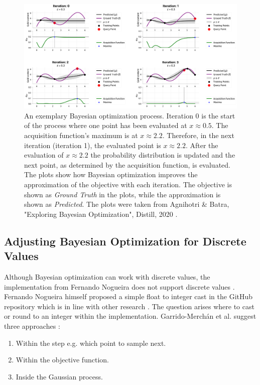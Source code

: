 \begin{figure}[!htb]
    \centering
    \includegraphics[width=\textwidth]{assets/bayesian_optimization_illustration.png}
    \caption{An exemplary Bayesian optimization process. Iteration 0 is the start of the process where one point has been evaluated at $x\approx0.5$. The acquisition function's maximum is at $x\approx2.2$. Therefore, in the next iteration (iteration 1), the evaluated point is $x\approx2.2$. After the evaluation of $x\approx2.2$ the probability distribution is updated and the next point, as determined by the acquisition function, is evaluated. The plots show how Bayesian optimization improves the approximation of the objective with each iteration. The objective is shown as \textit{Ground Truth} in the plots, while the approximation is shown as \textit{Predicted}. The plots were taken from Agnihotri & Batra, "Exploring Bayesian Optimization", Distill, 2020 \cite{agnihotri2020exploring}.}
    \label{figure/bayesian_optimization_illustration}
\end{figure}

\subsection{Adjusting Bayesian Optimization for Discrete Values}
Although Bayesian optimization can work with discrete values, the implementation from Fernando Nogueira does not support discrete values \cite{bayesianPythonPackage}. Fernando Nogueira himself proposed a simple float to integer cast in the GitHub repository \cite{bayesianPythonPackage} which is in line with other research \cite{garrido2020dealing}. The question arises where to cast or round to an integer within the implementation. Garrido-Merchán et al. suggest three approaches \cite{garrido2020dealing}: 
\begin{enumerate}
    \item Within the step e.g. which point to sample next.
    \item Within the objective function.
    \item Inside the Gaussian process.
\end{enumerate}

